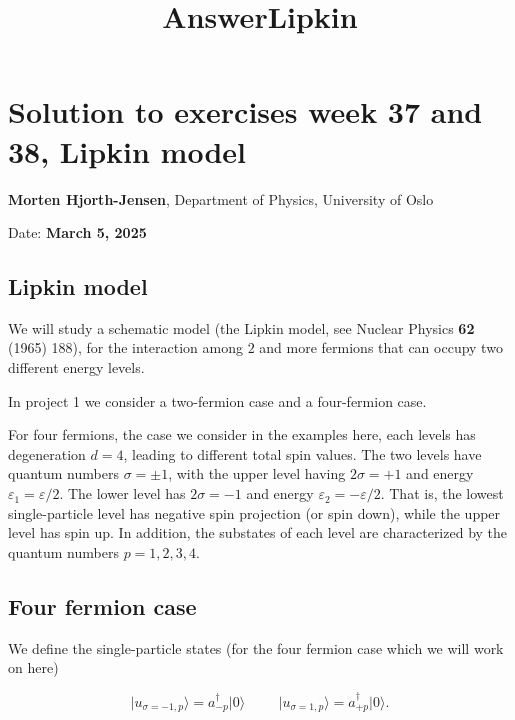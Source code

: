 \documentclass[11pt]{article}
\title{AnswerLipkin}
\begin{document}
    
    \maketitle
    
    

    
    

    \hypertarget{solution-to-exercises-week-37-and-38-lipkin-model}{%
\section{Solution to exercises week 37 and 38, Lipkin
model}\label{solution-to-exercises-week-37-and-38-lipkin-model}}

\textbf{Morten Hjorth-Jensen}, Department of Physics, University of Oslo

Date: \textbf{March 5, 2025}

    \hypertarget{lipkin-model}{%
\subsection{Lipkin model}\label{lipkin-model}}

We will study a schematic model (the Lipkin model, see Nuclear Physics
\textbf{62} (1965) 188), for the interaction among \(2\) and more
fermions that can occupy two different energy levels.

In project 1 we consider a two-fermion case and a four-fermion case.

For four fermions, the case we consider in the examples here, each
levels has degeneration \(d=4\), leading to different total spin values.
The two levels have quantum numbers \(\sigma=\pm 1\), with the upper
level having \(2\sigma=+1\) and energy
\(\varepsilon_{1}= \varepsilon/2\). The lower level has \(2\sigma=-1\)
and energy \(\varepsilon_{2}=-\varepsilon/2\). That is, the lowest
single-particle level has negative spin projection (or spin down), while
the upper level has spin up. In addition, the substates of each level
are characterized by the quantum numbers \(p=1,2,3,4\).

    \hypertarget{four-fermion-case}{%
\subsection{Four fermion case}\label{four-fermion-case}}

We define the single-particle states (for the four fermion case which we
will work on here)

    \[
\vert u_{\sigma =-1,p}\rangle=a_{-p}^{\dagger}\vert 0\rangle
\hspace{1cm}
\vert u_{\sigma =1,p}\rangle=a_{+p}^{\dagger}\vert 0\rangle.
\]
\end{document}
